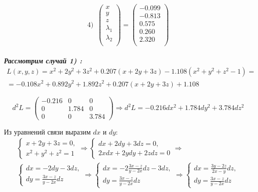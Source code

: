 \documentclass[a5paper, 10pt]{article}
\theoremstyle{definition}
\theoremstyle{plain}
\theoremstyle{remark}
\begin{document}
\begin{equation}
4) \, \, \, 
\begin{pmatrix}
x \\
y \\
z \\
\lambda_1\\
\lambda_2\\
\end{pmatrix}
=
\begin{pmatrix}
-0.099 \\
-0.813 \\
0.575 \\
0.260\\
2.320\\
\end{pmatrix}
\end{equation}
\\

\textit{\textbf{Рассмотрим случай 1) :}}
\begin{multline}
L(x, y, z) = x^2+2y^2+3z^2  + 0.207  \left(  x + 2y+3z \right) - 1.108 \left( x^2 +y^2+z^2 - 1   \right) = \\
= -0.108 x^2 + 0.892 y^2 + 1.892 z^2 + 0.207  \left(  x + 2y+3z \right)  + 1.108
\end{multline}

\begin{equation}
d^2L = 
\begin{pmatrix}
-0.216 & 0 & 0\\
0 & 1.784 & 0\\
0 & 0 & 3.784
\end{pmatrix}
\Rightarrow d^2L = -0.216 d x^ 2 + 1.784 dy^2 + 3.784 dz^2
\end{equation}

Из уравнений связи выразим $dx$ и $dy$:
\begin{multline}
\begin{cases}
 x + 2y+3z=0, \\
 x^2 +y^2+z^2=1
\end{cases}
\Rightarrow
\begin{cases}
 dx + 2dy+3dz=0, \\
 2xdx +2ydy+2zdz=0
\end{cases}
\Rightarrow \\
\begin{cases}
 dx = - 2dy-3dz, \\
 dy= \frac{3x - z}{y - 2x}dz
\end{cases}
\Rightarrow 
\begin{cases}
 dx = - 2 \frac{3x - z}{y - 2x}dz-3dz, \\
 dy= \frac{3x - z}{y - 2x}dz
\end{cases}
\Rightarrow 
\begin{cases}
 dx = \frac{3y- 2z}{2x -y}dz, \\
 dy= \frac{3x - z}{y - 2x}dz
\end{cases}
\end{multline}
\end{document}
